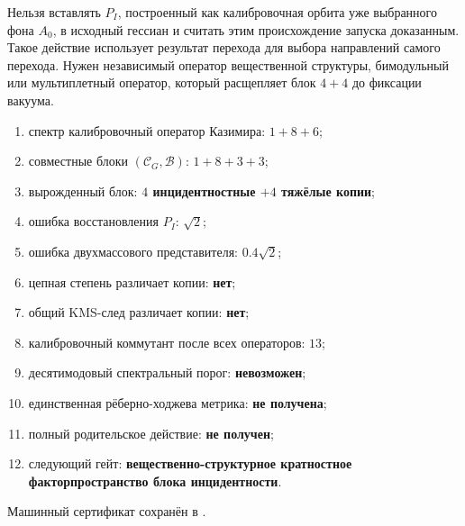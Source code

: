 \begin{nogocriterion}
Нельзя вставлять $P_I$, построенный как калибровочная орбита уже выбранного фона
$A_0$, в исходный гессиан и считать этим происхождение запуска доказанным.
Такое действие использует результат перехода для выбора направлений самого
перехода. Нужен независимый оператор вещественной структуры, бимодульный или мультиплетный оператор,
который расщепляет блок $4+4$ до фиксации вакуума.
\end{nogocriterion}

\begin{protocol}
\begin{enumerate}
 \item спектр калибровочный оператор Казимира: \textbf{$1+8+6$};
 \item совместные блоки $(\mathcal C_G,\mathcal B)$:
 \textbf{$1+8+3+3$};
 \item вырожденный блок: \textbf{$4$ инцидентностные $+4$ тяжёлые копии};
 \item ошибка восстановления $P_I$: \textbf{$\sqrt2$};
 \item ошибка двухмассового представителя: \textbf{$0.4\sqrt2$};
 \item цепная степень различает копии: \textbf{нет};
 \item общий KMS-след различает копии: \textbf{нет};
 \item калибровочный коммутант после всех операторов: \textbf{$13$};
 \item десятимодовый спектральный порог: \textbf{невозможен};
 \item единственная рёберно-ходжева метрика: \textbf{не получена};
 \item полный родительское действие: \textbf{не получен};
 \item следующий гейт: \textbf{вещественно-структурное кратностное факторпространство блока инцидентности}.
\end{enumerate}
\end{protocol}

Машинный сертификат сохранён в
.